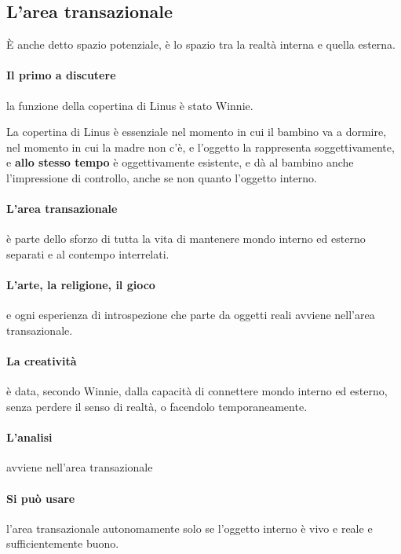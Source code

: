 \documentclass[12pt, a4paper]{article}
\begin{document}
\subsection{L'area transazionale}

\`E anche detto spazio potenziale, \`e lo spazio tra la realt\`a interna e quella esterna.

\paragraph{Il primo a discutere} la funzione della copertina di Linus \`e stato Winnie.

La copertina di Linus \`e essenziale nel momento in cui il bambino va a dormire, nel momento in cui la madre non c'\`e, e l'oggetto la rappresenta soggettivamente, e \textbf{allo stesso tempo} \`e oggettivamente esistente, e d\`a al bambino anche l'impressione di controllo, anche se non quanto l'oggetto interno.

\paragraph{L'area transazionale} \`e parte dello sforzo di tutta la vita di mantenere mondo interno ed esterno separati e al contempo interrelati.

\paragraph{L'arte, la religione, il gioco} e ogni esperienza di introspezione che parte da oggetti reali avviene nell'area transazionale.

\paragraph{La creativit\`a} \`e data, secondo Winnie, dalla capacit\`a di connettere mondo interno ed esterno, senza perdere il senso di realt\`a, o facendolo temporaneamente.

\paragraph{L'analisi} avviene nell'area transazionale

\paragraph{Si può usare} l'area transazionale autonomamente solo se l'oggetto interno \`e vivo e reale e sufficientemente buono.
\end{document}
